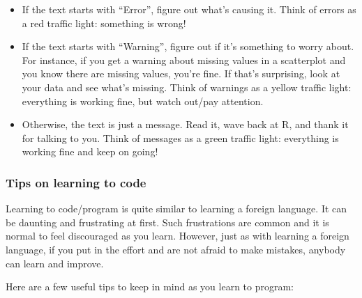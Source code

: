 \documentclass[
]{article}
\providecommand{\tightlist}{%
  \setlength{\itemsep}{0pt}\setlength{\parskip}{0pt}}
\begin{document}
\begin{itemize}
\tightlist
\item
  If the text starts with ``Error'', figure out what's causing it.
  {Think of errors as a red traffic light: something is wrong!}
\item
  If the text starts with ``Warning'', figure out if it's something to
  worry about. For instance, if you get a warning about missing values
  in a scatterplot and you know there are missing values, you're fine.
  If that's surprising, look at your data and see what's missing. {Think
  of warnings as a yellow traffic light: everything is working fine, but
  watch out/pay attention.}
\item
  Otherwise, the text is just a message. Read it, wave back at R, and
  thank it for talking to you. {Think of messages as a green traffic
  light: everything is working fine and keep on going!}
\end{itemize}

\hypertarget{tips-code}{%
\subsubsection{Tips on learning to code}\label{tips-code}}

Learning to code/program is quite similar to learning a foreign
language. It can be daunting and frustrating at first. Such frustrations
are common and it is normal to feel discouraged as you learn. However,
just as with learning a foreign language, if you put in the effort and
are not afraid to make mistakes, anybody can learn and improve.

Here are a few useful tips to keep in mind as you learn to program:
\end{document}
